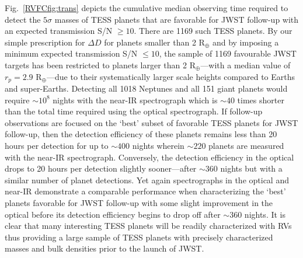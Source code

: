 Fig.~\ref{RVFCfig:trans} depicts the cumulative median observing time required to detect the $5\sigma$ masses
of TESS planets that are favorable for JWST follow-up with an expected transmission S/N $\geq 10$.
There are 1169 such TESS planets. By our simple prescription for $\Delta D$ for planets smaller than 2 R$_{\oplus}$
and by imposing a minimum expected transmission S/N $\leq 10$, the sample of 1169 favourable JWST
targets has been restricted to planets larger than 2 R$_{\oplus}$---with a median value
of $r_p = 2.9$ R$_{\oplus}$---due to their systematically larger scale
heights compared to Earths and super-Earths.
Detecting all 1018 Neptunes and all 151 giant planets would require $\sim 10^8$ nights with the near-IR
spectrograph which is $\sim 40$ times
shorter than the total time required using the optical spectrograph.
If follow-up observations are focused on the `best' subset of favorable TESS planets for JWST follow-up,
then the detection efficiency of these planets remains less than 20 hours per detection for up to $\sim 400$
nights wherein $\sim 220$ planets are measured with the near-IR spectrograph. Conversely, the detection
efficiency in the optical drops to 20 hours per detection slightly sooner---after $\sim 360$ nights but with
a similar number of planet detections.
Yet again spectrographs in the optical and near-IR demonstrate a comparable performance
when characterizing the `best' planets favorable for JWST follow-up with some slight improvement in the
optical before its detection efficiency begins to drop off after $\sim 360$ nights. 
It is clear that many interesting TESS planets will be readily
characterized with RVs thus providing a large sample of TESS planets with precisely characterized masses
and bulk densities prior to the launch of JWST.

